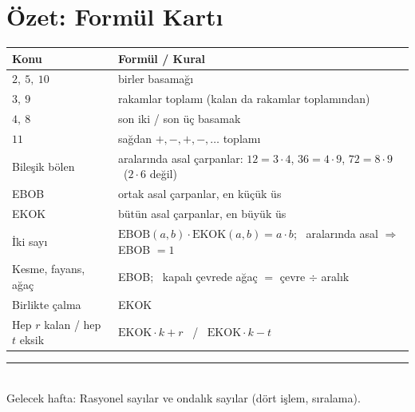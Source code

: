 \documentclass[11pt,a4paper]{article}
\newcounter{alis}
\begin{document}
\section{Özet: Formül Kartı}
\begin{center}
\renewcommand{\arraystretch}{1.35}
\begin{tabular}{@{}ll@{}}
\toprule
Konu & Formül / Kural\\\midrule
\(2,\ 5,\ 10\) & birler basamağı\\
\(3,\ 9\) & rakamlar toplamı (kalan da rakamlar toplamından)\\
\(4,\ 8\) & son iki / son üç basamak\\
\(11\) & sağdan \(+,-,+,-,\dots\) toplamı\\
Bileşik bölen & aralarında asal çarpanlar: \(12=3\cdot 4\), \(36=4\cdot 9\), \(72=8\cdot 9\) \ (\(2\cdot 6\) değil)\\
EBOB & ortak asal çarpanlar, en küçük üs\\
EKOK & bütün asal çarpanlar, en büyük üs\\
İki sayı & \(\text{EBOB}(a,b)\cdot\text{EKOK}(a,b)=a\cdot b\); \ aralarında asal \(\Rightarrow\) EBOB \(=1\)\\
Kesme, fayans, ağaç & EBOB; \ kapalı çevrede ağaç \(=\) çevre \(\div\) aralık\\
Birlikte çalma & EKOK\\
Hep \(r\) kalan / hep \(t\) eksik & \(\text{EKOK}\cdot k+r\) \ / \ \(\text{EKOK}\cdot k-t\)\\\bottomrule
\end{tabular}
\end{center}

\newpage


\vspace{6pt}
\noindent\textcolor{anamavi}{\rule{\textwidth}{0.5pt}}\\
{\small Gelecek hafta: Rasyonel sayılar ve ondalık sayılar (dört işlem, sıralama).}
\end{document}
